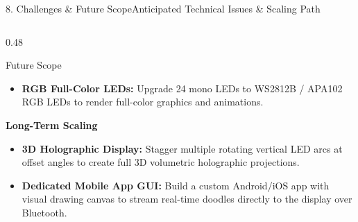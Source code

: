 \documentclass[aspectratio=169, 10pt]{beamer}
\begin{document}
\begin{frame}{8. Challenges \& Future Scope}{Anticipated Technical Issues \& Scaling Path}
\begin{columns}[T]
\begin{column}{0.48\textwidth}
\begin{block}{Future Scope}
\begin{itemize}
                    \item \textbf{RGB Full-Color LEDs:} Upgrade 24 mono LEDs to WS2812B / APA102 RGB LEDs to render full-color graphics and animations.
                \end{itemize}
                \textbf{Long-Term Scaling}
                \begin{itemize}
                    \item \textbf{3D Holographic Display:} Stagger multiple rotating vertical LED arcs at offset angles to create full 3D volumetric holographic projections.
                    \item \textbf{Dedicated Mobile App GUI:} Build a custom Android/iOS app with visual drawing canvas to stream real-time doodles directly to the display over Bluetooth.
                \end{itemize}
            \end{block}
        \end{column}
    \end{columns}
\end{frame}
\end{document}
